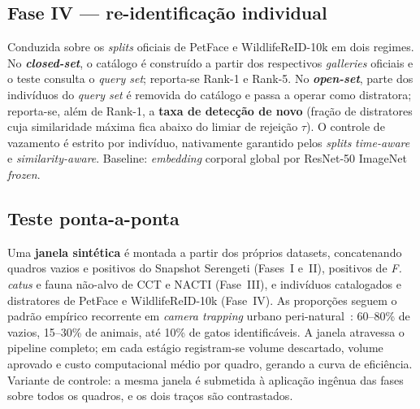 \subsection*{Fase IV --- re-identificação individual}
Conduzida sobre os \emph{splits} oficiais de PetFace e WildlifeReID-10k em dois regimes. No \textbf{\emph{closed-set}}, o catálogo é construído a partir dos respectivos \emph{galleries} oficiais e o teste consulta o \emph{query set}; reporta-se Rank-1 e Rank-5. No \textbf{\emph{open-set}}, parte dos indivíduos do \emph{query set} é removida do catálogo e passa a operar como distratora; reporta-se, além de Rank-1, a \textbf{taxa de detecção de novo} (fração de distratores cuja similaridade máxima fica abaixo do limiar de rejeição $\tau$). O controle de vazamento é estrito por indivíduo, nativamente garantido pelos \emph{splits} \emph{time-aware} e \emph{similarity-aware}. Baseline: \emph{embedding} corporal global por ResNet-50 ImageNet \emph{frozen}.

\subsection*{Teste ponta-a-ponta}
\label{sec:metodologia-end2end}
Uma \textbf{janela sintética} é montada a partir dos próprios datasets, concatenando quadros vazios e positivos do Snapshot Serengeti (Fases~I e~II), positivos de \emph{F.\,catus} e fauna não-alvo de CCT e NACTI (Fase~III), e indivíduos catalogados e distratores de PetFace e WildlifeReID-10k (Fase~IV). As proporções seguem o padrão empírico recorrente em \emph{camera trapping} urbano peri-natural~\cite{velez2022choosing}: 60--80\% de vazios, 15--30\% de animais, até 10\% de gatos identificáveis. A janela atravessa o pipeline completo; em cada estágio registram-se volume descartado, volume aprovado e custo computacional médio por quadro, gerando a curva de eficiência. Variante de controle: a mesma janela é submetida à aplicação ingênua das fases sobre todos os quadros, e os dois traços são contrastados.
